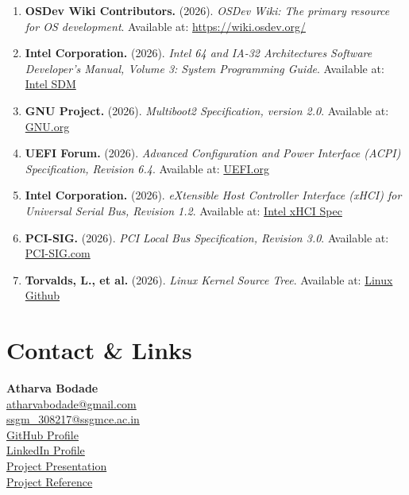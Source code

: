 \documentclass[12pt,a4paper]{report}
\begin{document}
\begin{enumerate}
    \item \textbf{OSDev Wiki Contributors.} (2026). \textit{OSDev Wiki: The primary resource for OS development}. Available at: \href{https://wiki.osdev.org/}{https://wiki.osdev.org/}
    \item \textbf{Intel Corporation.} (2026). \textit{Intel 64 and IA-32 Architectures Software Developer’s Manual, Volume 3: System Programming Guide}. Available at: \href{https://software.intel.com/content/www/us/en/develop/articles/intel-sdm.html}{Intel SDM}
    \item \textbf{GNU Project.} (2026). \textit{Multiboot2 Specification, version 2.0}. Available at: \href{https://www.gnu.org/software/grub/manual/multiboot2/}{GNU.org}
    \item \textbf{UEFI Forum.} (2026). \textit{Advanced Configuration and Power Interface (ACPI) Specification, Revision 6.4}. Available at: \href{https://uefi.org/specifications}{UEFI.org}
    \item \textbf{Intel Corporation.} (2026). \textit{eXtensible Host Controller Interface (xHCI) for Universal Serial Bus, Revision 1.2}. Available at: \href{https://www.intel.com/content/www/us/en/io/universal-serial-bus/extensible-host-controler-interface-usb-xhci.html}{Intel xHCI Spec}
    \item \textbf{PCI-SIG.} (2026). \textit{PCI Local Bus Specification, Revision 3.0}. Available at: \href{https://pcisig.com/specifications}{PCI-SIG.com}
    \item \textbf{Torvalds, L., et al.} (2026). \textit{Linux Kernel Source Tree}. Available at: \href{https://github.com/torvalds/linux}{Linux Github}
\end{enumerate}

\newpage

\chapter*{Contact \& Links}
\centering
\vspace{2cm}
\textbf{Atharva Bodade}\\
\vspace{1cm}
\href{mailto:atharvabodade@gmail.com}{atharvabodade@gmail.com}\\
\vspace{0.3cm}
\href{mailto:ssgm_308217@ssgmce.ac.in}{ssgm\_308217@ssgmce.ac.in}\\
\vspace{0.5cm}
\href{https://github.com/UnsettledAverage73}{GitHub Profile}\\
\vspace{0.3cm}
\href{https://www.linkedin.com/in/unsettledaverage73/}{LinkedIn Profile}\\
\vspace{0.3cm}
\href{https://youtu.be/3w8XI3YLobc}{Project Presentation}\\
\vspace{0.3cm}
\href{https://kernel.org/}{Project Reference}\\
\end{document}
